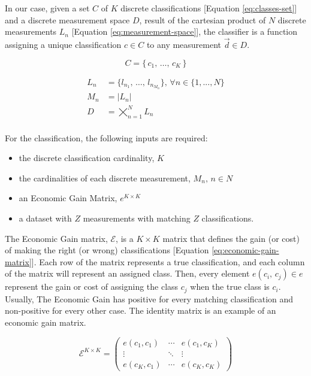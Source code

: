 \documentclass[letterpaper, conference]{IEEEtran}
\begin{document}
In our case, given a set $C$ of $K$ discrete classifications [Equation \ref{eq:classes-set}] and a discrete measurement space $D$, result of the cartesian product of $N$ discrete measurements $L_n$ [Equation \ref{eq:measurement-space}], the classifier is a function assigning a unique classification $c \in C$ to any measurement $\vec{d} \in D$.

\begin{equation}\label{eq:classes-set}
C = \{\,c_1,\, \dots,\, c_{K}\,\}
\end{equation}


\begin{equation}\label{eq:measurement-space}
  \begin{aligned}
  L_n &= \{l_{n_1},\, \dots,\, l_{n_{M_n}}\},\, \forall n \in \{ 1, ..., N \} \\
  M_n &= \vert L_n\vert \\
  D &= \bigtimes_{n=1}^{N} L_n \\
  \end{aligned}
\end{equation}

For the classification, the following inputs are required:

\begin{itemize}
  \item the discrete classification cardinality, $K$
  \item the cardinalities of each discrete measurement, $M_n,\, n \in N$
  \item an Economic Gain Matrix, $e^{K \times K}$
  \item a dataset with $Z$ measurements with matching $Z$ classifications. 
\end{itemize}

The Economic Gain matrix, $\mathcal{E}$, is a $K \times K$ matrix that defines the gain (or cost) of making the right (or wrong) classifications [Equation \ref{eq:economic-gain-matrix}]. Each row of the matrix represents a true classification, and each column of the matrix will represent an assigned class. Then, every element $e(c_i,\, c_j) \in e$ represent the gain or cost of assigning the class $c_j$ when the true class is $c_i$. Usually, The Economic Gain has positive for every matching classification and non-positive for every other case. The identity matrix is an example of an economic gain matrix.

\begin{equation}\label{eq:economic-gain-matrix}
  \mathcal{E}^{K \times K} = \begin{pmatrix}
    e(c_1,c_1) & \cdots & e(c_1,c_K) \\
      \vdots   & \ddots &   \vdots   \\
    e(c_K,c_1) & \cdots & e(c_K,c_K)
  \end{pmatrix}
\end{equation}
\end{document}
